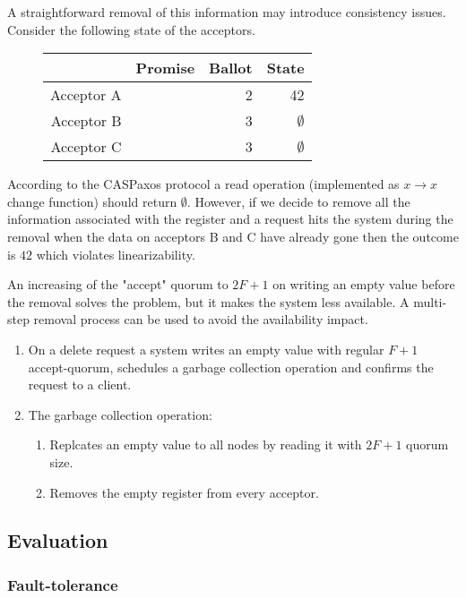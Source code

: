 \documentclass[12pt]{article}
\begin{document}
A straightforward removal of this information may introduce consistency issues. Consider the following state of the acceptors.

\begin{figure}[!h]
  \centering
  \begin{tabular}{ r|r|r|r }
    & Promise & Ballot & State \\ \hline
    Acceptor A && 2 & 42 \\
    Acceptor B && 3 & $\emptyset$ \\
    Acceptor C && 3 & $\emptyset$ \\
  \end{tabular}
\end{figure}

According to the CASPaxos protocol a read operation (implemented as $x \to x$ change function) should return $\emptyset$. However, if we decide to remove all the information associated with the register and a request hits the system during the removal when the data on acceptors B and C have already gone then the outcome is $42$ which violates linearizability.

An increasing of the "accept" quorum to $2F+1$ on writing an empty value before the removal solves the problem, but it makes the system less available. A multi-step removal process can be used to avoid the availability impact.

\begin{enumerate}
  \item On a delete request a system writes an empty value with regular $F+1$ accept-quorum, schedules a garbage collection operation and confirms the request to a client.
  \item The garbage collection operation:
  \begin{enumerate}
    \item Replcates an empty value to all nodes by reading it with $2F+1$ quorum size.
    \item Removes the empty register from every acceptor.
  \end{enumerate}
\end{enumerate}

\subsection{Evaluation}
\subsubsection{Fault-tolerance}
\end{document}
